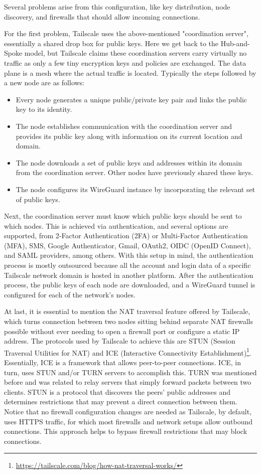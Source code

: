 Several problems arise from this configuration, like key distribution, node discovery, and firewalls that should allow incoming connections.

For the first problem, Tailscale uses the above-mentioned "coordination server", essentially a shared drop box for public keys. Here we get back to the Hub-and-Spoke model, but Tailscale claims these coordination servers carry virtually no traffic as only a few tiny encryption keys and policies are exchanged. The data plane is a mesh where the actual traffic is located. Typically the steps followed by a new node are as follows:

\begin{itemize}
    \item Every node generates a unique public/private key pair and links the public key to its identity.
    \item The node establishes communication with the coordination server and provides its public key along with information on its current location and domain.
    \item The node downloads a set of public keys and addresses within its domain from the coordination server. Other nodes have previously shared these keys.
    \item The node configures its WireGuard instance by incorporating the relevant set of public keys.
\end{itemize}

Next, the coordination server must know which public keys should be sent to which nodes. This is achieved via authentication, and several options are supported, from 2-Factor Authentication (2FA) or Multi-Factor Authentication (MFA), SMS, Google Authenticator, Gmail, OAuth2, OIDC (OpenID Connect), and SAML providers, among others. With this setup in mind, the authentication process is mostly outsourced because all the account and login data of a specific Tailscale network domain is hosted in another platform. After the authentication process, the public keys of each node are downloaded, and a WireGuard tunnel is configured for each of the network's nodes.

At last, it is essential to mention the NAT traversal feature offered by Tailscale, which turns connection between two nodes sitting behind separate NAT firewalls possible without ever needing to open a firewall port or configure a static IP address. The protocols used by Tailscale to achieve this are STUN (Session Traversal Utilities for NAT) and ICE (Interactive Connectivity Establishment)\footnote{\url{https://tailscale.com/blog/how-nat-traversal-works/}}. Essentially, ICE is a framework that allows peer-to-peer connections. ICE, in turn, uses STUN and/or TURN servers to accomplish this. TURN was mentioned before and was related to relay servers that simply forward packets between two clients. STUN is a protocol that discovers the peers' public addresses and determines restrictions that may prevent a direct connection between them. Notice that no firewall configuration changes are needed as Tailscale, by default, uses HTTPS traffic, for which most firewalls and network setups allow outbound connections. This approach helps to bypass firewall restrictions that may block connections.

